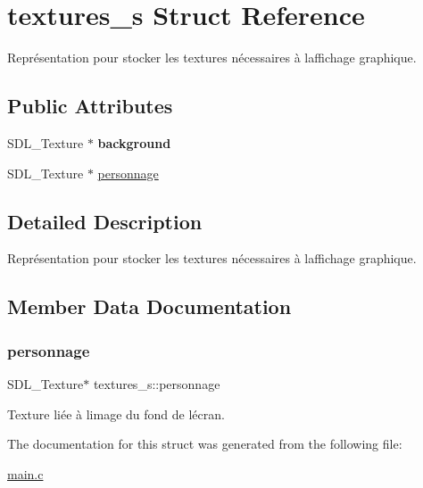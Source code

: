 \hypertarget{structtextures__s}{}\section{textures\+\_\+s Struct Reference}
\label{structtextures__s}


Représentation pour stocker les textures nécessaires à l\textquotesingle{}affichage graphique.  


\subsection*{Public Attributes}
\begin{DoxyCompactItemize}
\item 
\mbox{\label{structtextures__s_ac5a1f841b5f51e5cfd814aacae582e66}} 
S\+D\+L\+\_\+\+Texture $\ast$ {\bfseries background}
\item 
S\+D\+L\+\_\+\+Texture $\ast$ \hyperlink{structtextures__s_a8e841f295026e9f1d9b6bdf46d550de5}{personnage}
\end{DoxyCompactItemize}


\subsection{Detailed Description}
Représentation pour stocker les textures nécessaires à l\textquotesingle{}affichage graphique. 

\subsection{Member Data Documentation}
\mbox{\label{structtextures__s_a8e841f295026e9f1d9b6bdf46d550de5}} 
\subsubsection{\texorpdfstring{personnage}{personnage}}
{\footnotesize\ttfamily S\+D\+L\+\_\+\+Texture$\ast$ textures\+\_\+s\+::personnage}

Texture liée à l\textquotesingle{}image du fond de l\textquotesingle{}écran. 

The documentation for this struct was generated from the following file\+:\begin{DoxyCompactItemize}
\item 
\hyperlink{main_8c}{main.\+c}\end{DoxyCompactItemize}

